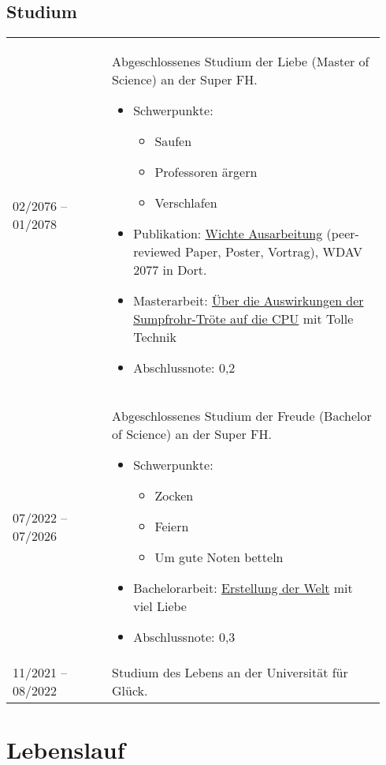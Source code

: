 \documentclass[11pt,parskip=half-]{scrartcl}
\newcommand*{\QuoteM}[1]{\frqq #1\flqq}
\newlength{\Lineskip}
\newlength{\Itemskip}
\newenvironment{Abschnitt}[1][0em]
{%
	\begin{spacing}{1.0}
    \begin{longtable}{p{0.25\linewidth}p{0.69\linewidth}}%
}
{%
    \end{longtable}%
    \end{spacing}
    \vspace{-10 pt}%
}
\begin{document}
	\subsection{Studium}
	\begin{Abschnitt}
	02/2076 -- 01/2078 
	& Abgeschlossenes Studium der Liebe (Master of Science) an der
	\QuoteM{Super FH}.
	\begin{itemize}
		\setlength\itemsep{\Itemskip}
		\item Schwerpunkte:
		\begin{itemize}
			\setlength\itemsep{0 pt}
			\item Saufen
			\item Professoren ärgern
			\item Verschlafen
		\end{itemize}
		\item Publikation: \QuoteM{\href{https://www.google.de}
		{Wichte Ausarbeitung}} (peer-reviewed Paper,
		Poster, Vortrag), WDAV 2077 in Dort.
		\item Masterarbeit: \QuoteM{\href{https://www.google.de}
		{Über die Auswirkungen der Sumpfrohr-Tröte auf die CPU}} mit Tolle 
		Technik
		\item Abschlussnote: 0,2
	\end{itemize}
	\\[\Lineskip]

	07/2022 -- 07/2026
	& Abgeschlossenes Studium der Freude (Bachelor of Science) an der 
	\QuoteM{Super FH}.
	\begin{itemize}
		\setlength\itemsep{\Itemskip}
		\item Schwerpunkte:
		\begin{itemize}
			\setlength\itemsep{0 pt}
			\item Zocken
			\item Feiern
			\item Um gute Noten betteln
		\end{itemize}
		\item Bachelorarbeit: \QuoteM{\href{https://www.google.de}{Erstellung der Welt}} mit viel Liebe
		\item Abschlussnote: 0,3
	\end{itemize}	
	\\[\Lineskip]

	11/2021 -- 08/2022
	& Studium des Lebens an der \QuoteM{Universität für Glück}.
	\end{Abschnitt}
	
	\clearpage
	\section{Lebenslauf}	
	
\end{document}
